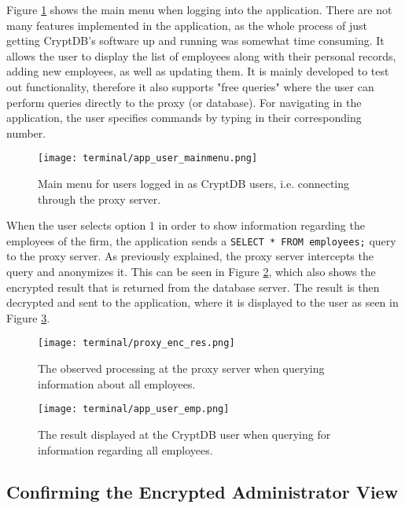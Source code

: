 Figure \ref{fig:app_mm_user} shows the main menu when logging into the application. There are not many features implemented in the application, as the whole process of just getting CryptDB's software up and running was somewhat time consuming. It allows the user to display the list of employees along with their personal records, adding new employees, as well as updating them. It is mainly developed to test out functionality, therefore it also supports "free queries" where the user can perform queries directly to the proxy (or database). For navigating in the application, the user specifies commands by typing in their corresponding number.

\begin{figure}[h]
	\centering
	\texttt{[image: terminal/app\_user\_mainmenu.png]}
	\caption{Main menu for users logged in as CryptDB users, i.e. connecting through the proxy server.}
	\label{fig:app_mm_user}
\end{figure}

When the user selects option 1 in order to show information regarding the employees of the firm, the application sends a \verb!SELECT * FROM employees;! query to the proxy server. As previously explained, the proxy server intercepts the query and anonymizes it. This can be seen in Figure \ref{fig:proxy_enc_res}, which also shows the encrypted result that is returned from the database server. The result is then decrypted and sent to the application, where it is displayed to the user as seen in Figure \ref{fig:app_user_emp}.

\begin{figure}[h]
	\centering
	\texttt{[image: terminal/proxy\_enc\_res.png]}
	\caption{The observed processing at the proxy server when querying information about all employees.}
	\label{fig:proxy_enc_res}
\end{figure}


\begin{figure}[h]
	\centering
	\texttt{[image: terminal/app\_user\_emp.png]}
	\caption{The result displayed at the CryptDB user when querying for information regarding all employees.}
	\label{fig:app_user_emp}
\end{figure}

\newpage

\subsection{Confirming the Encrypted Administrator View}

